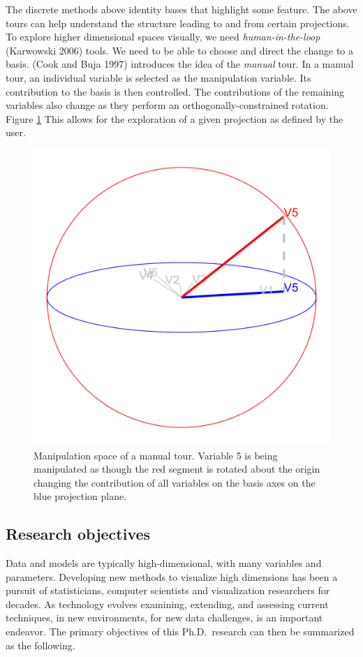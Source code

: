 \documentclass[11,]{article}
\theoremstyle{definition}
\theoremstyle{definition}
\theoremstyle{definition}
\theoremstyle{remark}
\begin{document}
The discrete methods above identity bases that highlight some feature.
The above tours can help understand the structure leading to and from
certain projections. To explore higher dimensional spaces visually, we
need \emph{human-in-the-loop} (Karwowski 2006) tools. We need to be able
to choose and direct the change to a basis. (Cook and Buja 1997)
introduces the idea of the \emph{manual} tour. In a manual tour, an
individual variable is selected as the manipulation variable. Its
contribution to the basis is then controlled. The contributions of the
remaining variables also change as they perform an
orthogonally-constrained rotation. Figure \ref{fig:manipSpace} This
allows for the exploration of a given projection as defined by the user.

\begin{figure}

{\centering \includegraphics[width=0.5\linewidth]{figures/manip_space} 

}

\caption{Manipulation space of a manual tour. Variable 5 is being manipulated as though the red segment is rotated about the origin changing the contribution of all variables on the basis axes on the blue projection plane.}\label{fig:manipSpace}
\end{figure}

\subsection{Research objectives}\label{research-objectives}

Data and models are typically high-dimensional, with many variables and
parameters. Developing new methods to visualize high dimensions has been
a pursuit of statisticians, computer scientists and visualization
researchers for decades. As technology evolves examining, extending, and
assessing current techniques, in new environments, for new data
challenges, is an important endeavor. The primary objectives of this
Ph.D.~research can then be summarized as the following.
\end{document}
